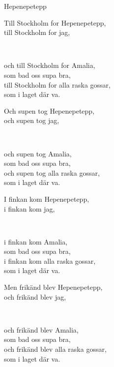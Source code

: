 \begin{song}{Hepenepetepp}


    \showversenumber	
	\begin{repetition}
		Till Stockholm for Hepenepetepp,\\
		till Stockholm for jag,
	\end{repetition}\\
	\begin{repetition}
		och till Stockholm for Amalia,\\
		som bad oss supa bra,\\
		till Stockholm for alla raska gossar,\\
		som i laget där va.
	\end{repetition}
	
    \showversenumber
	\begin{repetition}
		Och supen tog Hepenepetepp,\\
		och supen tog jag,
	\end{repetition}\\
	\begin{repetition}
		och supen tog Amalia,\\
		som bad oss supa bra,\\
		och supen tog alla raska gossar,\\
		som i laget där va.
	\end{repetition}
	
    \showversenumber
	\begin{repetition}
		I finkan kom Hepenepetepp,\\
		i finkan kom jag,
	\end{repetition}\\
	\begin{repetition}
		i finkan kom Amalia,\\
		som bad oss supa bra,\\
		i finkan kom alla raska gossar,\\
		som i laget där va.
	\end{repetition}
	
    \showversenumber
	\begin{repetition}
		Men frikänd blev Hepenepetepp,\\
		och frikänd blev jag,
	\end{repetition}\\
	\begin{repetition}
		och frikänd blev Amalia,\\
		som bad oss supa bra,\\
		och frikänd blev alla raska gossar,\\
		som i laget där va.
	\end{repetition}
	
\end{song}

